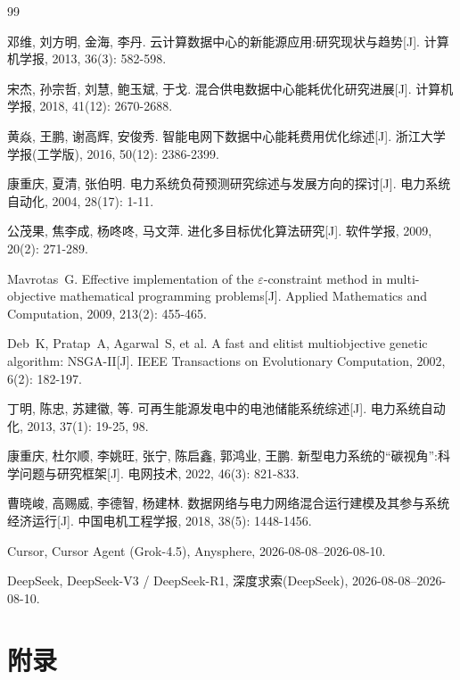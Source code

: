 \documentclass[UTF8,a4paper,zihao=-4]{ctexart}
\begin{document}
\begin{thebibliography}{99}

邓维, 刘方明, 金海, 李丹. 云计算数据中心的新能源应用:研究现状与趋势[J]. 计算机学报, 2013, 36(3): 582-598.

宋杰, 孙宗哲, 刘慧, 鲍玉斌, 于戈. 混合供电数据中心能耗优化研究进展[J]. 计算机学报, 2018, 41(12): 2670-2688.

黄焱, 王鹏, 谢高辉, 安俊秀. 智能电网下数据中心能耗费用优化综述[J]. 浙江大学学报(工学版), 2016, 50(12): 2386-2399.

康重庆, 夏清, 张伯明. 电力系统负荷预测研究综述与发展方向的探讨[J]. 电力系统自动化, 2004, 28(17): 1-11.

公茂果, 焦李成, 杨咚咚, 马文萍. 进化多目标优化算法研究[J]. 软件学报, 2009, 20(2): 271-289.

Mavrotas~G. Effective implementation of the $\varepsilon$-constraint method in multi-objective mathematical programming problems[J]. Applied Mathematics and Computation, 2009, 213(2): 455-465.

Deb~K, Pratap~A, Agarwal~S, et al. A fast and elitist multiobjective genetic algorithm: NSGA-II[J]. IEEE Transactions on Evolutionary Computation, 2002, 6(2): 182-197.

丁明, 陈忠, 苏建徽, 等. 可再生能源发电中的电池储能系统综述[J]. 电力系统自动化, 2013, 37(1): 19-25, 98.

康重庆, 杜尔顺, 李姚旺, 张宁, 陈启鑫, 郭鸿业, 王鹏. 新型电力系统的“碳视角”:科学问题与研究框架[J]. 电网技术, 2022, 46(3): 821-833.

曹晓峻, 高赐威, 李德智, 杨建林. 数据网络与电力网络混合运行建模及其参与系统经济运行[J]. 中国电机工程学报, 2018, 38(5): 1448-1456.

Cursor, Cursor Agent (Grok-4.5), Anysphere, 2026-08-08--2026-08-10.

DeepSeek, DeepSeek-V3 / DeepSeek-R1, 深度求索(DeepSeek), 2026-08-08--2026-08-10.

\end{thebibliography}


\newpage
{}




\section{附录}
\end{document}

